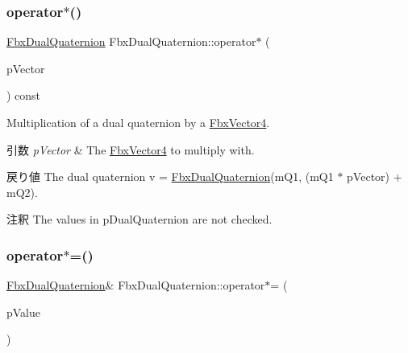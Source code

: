 \subsubsection{\texorpdfstring{operator$\ast$()}{operator*()}\hspace{0.1cm}{\footnotesize\ttfamily [3/3]}}
{\footnotesize\ttfamily \hyperlink{class_fbx_dual_quaternion}{Fbx\+Dual\+Quaternion} Fbx\+Dual\+Quaternion\+::operator$\ast$ (\begin{DoxyParamCaption}\item[{const \hyperlink{class_fbx_vector4}{Fbx\+Vector4}}]{p\+Vector }\end{DoxyParamCaption}) const}

Multiplication of a dual quaternion by a \hyperlink{class_fbx_vector4}{Fbx\+Vector4}. 
\begin{DoxyParams}{引数}
{\em p\+Vector} & The \hyperlink{class_fbx_vector4}{Fbx\+Vector4} to multiply with. \\
\hline
\end{DoxyParams}
\begin{DoxyReturn}{戻り値}
The dual quaternion v\textquotesingle{} = \hyperlink{class_fbx_dual_quaternion}{Fbx\+Dual\+Quaternion}(m\+Q1, (m\+Q1 $\ast$ p\+Vector) + m\+Q2). 
\end{DoxyReturn}
\begin{DoxyRemark}{注釈}
The values in p\+Dual\+Quaternion are not checked. 
\end{DoxyRemark}
\mbox{\label{class_fbx_dual_quaternion_af1410bc58c2d270f37a75f12e9aaedb1}} 
\subsubsection{\texorpdfstring{operator$\ast$=()}{operator*=()}\hspace{0.1cm}{\footnotesize\ttfamily [1/2]}}
{\footnotesize\ttfamily \hyperlink{class_fbx_dual_quaternion}{Fbx\+Dual\+Quaternion}\& Fbx\+Dual\+Quaternion\+::operator$\ast$= (\begin{DoxyParamCaption}\item[{double}]{p\+Value }\end{DoxyParamCaption})}

